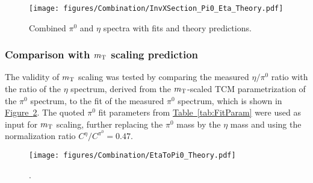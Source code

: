  		\begin{figure}[h]
 			\centering
 			\texttt{[image: figures/Combination/InvXSection\_Pi0\_Eta\_Theory.pdf]}
 			\caption{Combined $\pi^0$ and $\eta$ spectra with fits and theory predictions.}
 			\label{fig:Pi0Eta_Theory}
 		\end{figure}

%
%
\subsubsection{\texorpdfstring{Comparison with $m_{\rm T}$ scaling prediction}{Comparison with mT scaling prediction}}
 The validity of $m_{\rm T}$ scaling was tested by comparing the measured $\eta/\pi^{0}$ ratio with the ratio of the $\eta$ spectrum, derived from the $m_{\rm T}$-scaled TCM parametrization of the $\pi^0$ spectrum, to the fit of the measured $\pi^0$ spectrum, which is shown in \hyperref[fig:mTscaling]{Figure~\ref*{fig:mTscaling}}.
 The quoted $\pi^0$ fit parameters from \hyperref[tab:FitParam]{Table~\ref*{tab:FitParam}} were used as input for $m_{\rm T}$ scaling, further replacing the $\pi^0$ mass by the $\eta$ mass and using the normalization ratio $C^{\eta}/C^{\pi^0}=0.47$.

  	    \begin{figure}[h]
 			\centering
			\texttt{[image: figures/Combination/EtaToPi0\_Theory.pdf]}
 			\caption{.}
 			\label{fig:mTscaling}
 		\end{figure}

